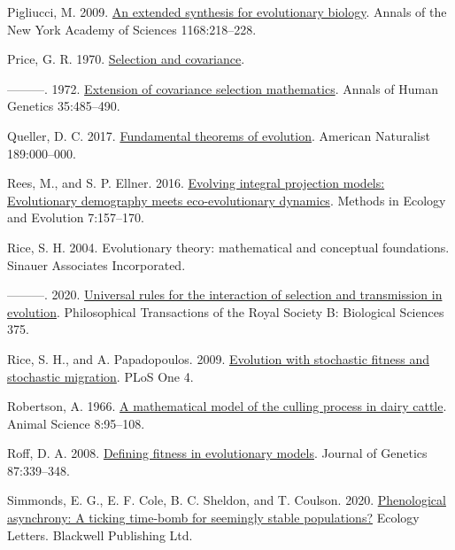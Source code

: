 \documentclass[
]{article}
\newlength{\cslhangindent}
\newenvironment{CSLReferences}[2] %
 {\begin{list}{}{%
  \setlength{\itemindent}{0pt}
  \setlength{\leftmargin}{0pt}
  \setlength{\parsep}{0pt}
  \ifodd #1
   \setlength{\leftmargin}{\cslhangindent}
   \setlength{\itemindent}{-1\cslhangindent}
  \fi
  \setlength{\itemsep}{#2\baselineskip}}}
 {\end{list}}
\begin{document}
\begin{CSLReferences}{0}{0}
Pigliucci, M. 2009.
\href{https://doi.org/10.1111/j.1749-6632.2009.04578.x}{{An extended
synthesis for evolutionary biology}}. Annals of the New York Academy of
Sciences 1168:218--228.

Price, G. R. 1970. \href{https://doi.org/10.1038/227520a0}{{Selection
and covariance}}.

---------. 1972.
\href{https://doi.org/10.1111/j.1469-1809.1957.tb01874.x}{{Extension of
covariance selection mathematics}}. Annals of Human Genetics
35:485--490.

Queller, D. C. 2017. \href{https://doi.org/10.1086/690937}{{Fundamental
theorems of evolution}}. American Naturalist 189:000--000.

Rees, M., and S. P. Ellner. 2016.
\href{https://doi.org/10.1111/2041-210X.12487}{Evolving integral
projection models: Evolutionary demography meets eco-evolutionary
dynamics}. Methods in Ecology and Evolution 7:157--170.

Rice, S. H. 2004. {Evolutionary theory: mathematical and conceptual
foundations}. Sinauer Associates Incorporated.

---------. 2020.
\href{https://doi.org/10.1098/rstb.2019.0353}{{Universal rules for the
interaction of selection and transmission in evolution}}. Philosophical
Transactions of the Royal Society B: Biological Sciences 375.

Rice, S. H., and A. Papadopoulos. 2009.
\href{https://doi.org/10.1371/journal.pone.0007130}{{Evolution with
stochastic fitness and stochastic migration}}. PLoS One 4.

Robertson, A. 1966. \href{https://doi.org/10.1017/S0003356100037752}{{A
mathematical model of the culling process in dairy cattle}}. Animal
Science 8:95--108.

Roff, D. A. 2008.
\href{https://doi.org/10.1007/s12041-008-0056-9}{{Defining fitness in
evolutionary models}}. Journal of Genetics 87:339--348.

Simmonds, E. G., E. F. Cole, B. C. Sheldon, and T. Coulson. 2020.
\href{https://doi.org/10.1111/ele.13603}{Phenological asynchrony: A
ticking time-bomb for seemingly stable populations?} Ecology Letters.
Blackwell Publishing Ltd.


\end{CSLReferences}
\end{document}
